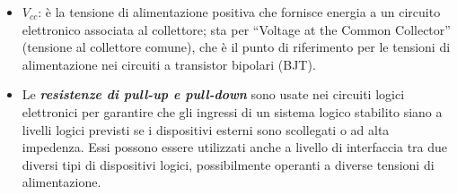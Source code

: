 \documentclass[
]{book}
\providecommand{\tightlist}{%
  \setlength{\itemsep}{0pt}\setlength{\parskip}{0pt}}
\begin{document}
\begin{itemize}
\tightlist
\item
  \(V_{cc}\): è la tensione di alimentazione positiva che fornisce
  energia a un circuito elettronico associata al collettore; sta per
  ``Voltage at the Common Collector'' (tensione al collettore comune),
  che è il punto di riferimento per le tensioni di alimentazione nei
  circuiti a transistor bipolari (BJT).
\item
  Le \textbf{\emph{resistenze di pull-up e pull-down}} sono usate nei
  circuiti logici elettronici per garantire che gli ingressi di un
  sistema logico stabilito siano a livelli logici previsti se i
  dispositivi esterni sono scollegati o ad alta impedenza. Essi possono
  essere utilizzati anche a livello di interfaccia tra due diversi tipi
  di dispositivi logici, possibilmente operanti a diverse tensioni di
  alimentazione.

  \begin{table}[H]
    \centering
    \caption{Tabella di comportamento del segnale dell'interruttore con vari resistori}
  \end{table}
\end{itemize}

\backmatter
\end{document}
